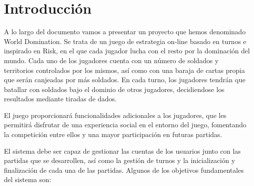 \documentclass[11pt, a4paper, titlepage]{article}
\begin{document}
\thispagestyle{empty}
\fontsize{11pt}{11pt}\selectfont

\setcounter{tocdepth}{2}

{
    \hypersetup{linkcolor=black}
    \doublespacing
    \tableofcontents
}

\thispagestyle{empty}

\clearpage
\setcounter{page}{1}
\section{Introducción}
A lo largo del documento vamos a presentar un proyecto que hemos denominado World Domination. Se trata de un juego de estrategia on-line basado en turnos e inspirado en Risk, en el que cada jugador lucha con el resto por la dominación del mundo. Cada uno de los jugadores cuenta con un número de soldados y territorios controlados por los mismos, así como con una baraja de cartas propia que serán canjeadas por más soldados. En cada turno, los jugadores tendrán que batallar con soldados bajo el dominio de otros jugadores, decidiendose los resultados mediante tiradas de dados. \newline

El juego proporcionará funcionalidades adicionales a los jugadores, que les permitirá disfrutar de una experiencia social en el entorno del juego, fomentando la competición entre ellos y una mayor participación en futuras partidas. \newline

El sistema debe ser capaz de gestionar las cuentas de los usuarios junto con las partidas que se desarrollen, así como la gestión de turnos y la inicialización y finalización de cada una de las partidas. Algunos de los objetivos fundamentales del sistema son: 
\end{document}
